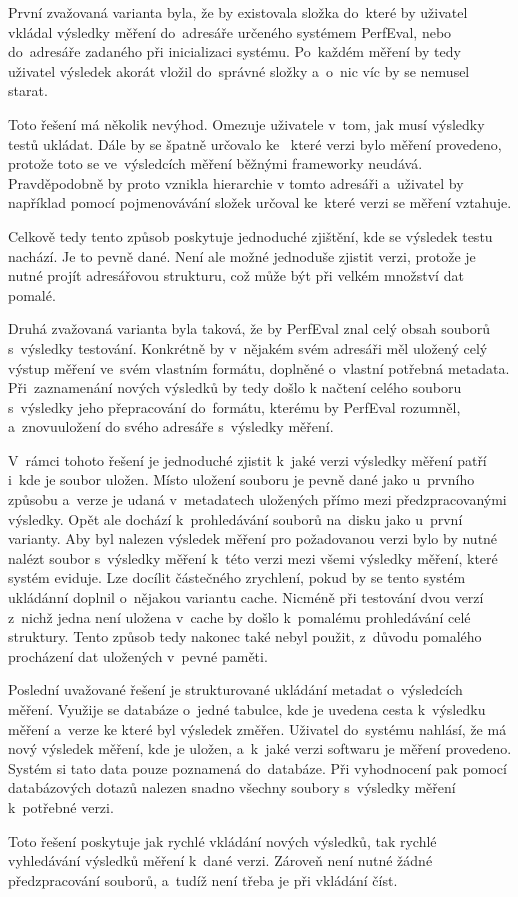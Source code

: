 První zvažovaná varianta byla, že by existovala složka do~které by uživatel vkládal výsledky měření do~adresáře určeného
systémem PerfEval, nebo do~adresáře zadaného při inicializaci systému. Po~každém měření by tedy uživatel výsledek akorát
vložil do~správné složky a~o~nic víc by se nemusel starat.

Toto řešení má několik nevýhod. Omezuje uživatele v~tom, jak musí výsledky testů ukládat. Dále by se špatně určovalo ke~
které verzi bylo měření provedeno, protože toto se ve~výsledcích měření běžnými frameworky neudává. Pravděpodobně by proto
vznikla hierarchie v tomto adresáři a~uživatel by například pomocí pojmenovávání složek určoval ke~které verzi se měření vztahuje.

Celkově tedy tento způsob poskytuje jednoduché zjištění, kde se výsledek testu nachází. Je to pevně dané. Není ale možné jednoduše
zjistit verzi, protože je nutné projít adresářovou strukturu, což může být při velkém množství dat pomalé.

Druhá zvažovaná varianta byla taková, že by PerfEval znal celý obsah souborů s~výsledky testování. Konkrétně by v~nějakém
svém adresáři měl uložený celý výstup měření ve~svém vlastním formátu, doplněné o~vlastní potřebná metadata. Při~zaznamenání
nových výsledků by tedy došlo k načtení celého souboru s~výsledky jeho přepracování do~formátu, kterému by PerfEval rozumněl,
a~znovuuložení do svého adresáře s~výsledky měření.

V~rámci tohoto řešení je jednoduché zjistit k~jaké verzi výsledky měření patří i~kde je soubor uložen. Místo uložení souboru
je pevně dané jako u~prvního způsobu a~verze je udaná v~metadatech uložených přímo mezi předzpracovanými výsledky. Opět
ale dochází k~prohledávání souborů na~disku jako u~první varianty. Aby byl nalezen výsledek měření pro požadovanou verzi bylo
by nutné nalézt soubor s~výsledky měření k~této verzi mezi všemi výsledky měření, které systém eviduje. Lze docílit částečného
zrychlení, pokud by se tento systém ukládánní doplnil o~nějakou variantu cache. Nicméně při testování dvou verzí z~nichž
jedna není uložena v~cache by došlo k~pomalému prohledávání celé struktury.
Tento způsob tedy nakonec také nebyl použit, z~důvodu pomalého procházení dat uložených v~pevné paměti.

Poslední uvažované řešení je strukturované ukládání metadat o~výsledcích měření. Využije se databáze o~jedné tabulce, kde
je uvedena cesta k~výsledku měření a~verze ke které byl výsledek změřen. Uživatel do~systému nahlásí, že má nový výsledek
měření, kde je uložen, a~k~jaké verzi softwaru je měření provedeno. Systém si tato data pouze poznamená do~databáze. Při
vyhodnocení pak pomocí databázových dotazů nalezen snadno všechny soubory s~výsledky měření k~potřebné verzi.

Toto řešení poskytuje jak rychlé vkládání nových výsledků, tak rychlé vyhledávání výsledků měření k~dané verzi. Zároveň
není nutné žádné předzpracování souborů, a~tudíž není třeba je při vkládání číst.